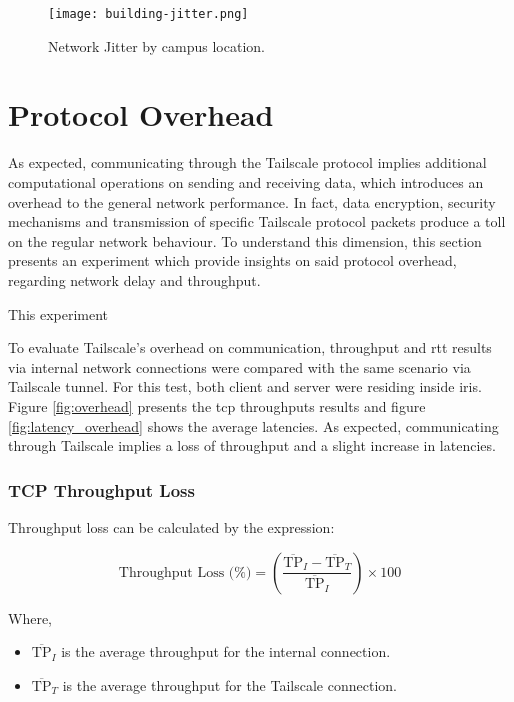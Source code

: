 \documentclass[11pt,twoside,a4paper]{report}
\begin{document}
\begin{figure}[h]
\centering
  \texttt{[image: building-jitter.png]}
  \caption{Network Jitter by campus location.}
  \label{fig:uajitter}
\end{figure}


\section{Protocol Overhead}

As expected, communicating through the Tailscale protocol implies additional computational operations on sending and receiving data, which introduces an overhead to the general network performance. In fact, data encryption, security mechanisms and transmission of specific Tailscale protocol packets produce a toll on the regular network behaviour. To understand this dimension, this section presents an experiment which provide insights on said protocol overhead, regarding network delay and throughput.

This experiment

To evaluate Tailscale's overhead on communication, throughput and \ac{rtt} results via internal network connections were compared with the same scenario via Tailscale tunnel. For this test, both client and server were residing inside \ac{iris}. Figure \ref{fig:overhead} presents the \ac{tcp} throughputs results and figure \ref{fig:latency_overhead} shows the average latencies. As expected, communicating through Tailscale implies a loss of throughput and a slight increase in latencies.

\subsubsection{TCP Throughput Loss}

Throughput loss can be calculated by the expression:

\[
\text{Throughput Loss (\%)} = \left( \frac{ \overline{\text{TP}}_I - \overline{\text{TP}}_T }{ \overline{\text{TP}}_I } \right) \times 100
\]

Where,

\begin{itemize}
    \item \( \overline{\text{TP}}_I \) is the average throughput for the internal connection.
    \item \( \overline{\text{TP}}_T \) is the average throughput for the Tailscale connection.
\end{itemize}
\end{document}
